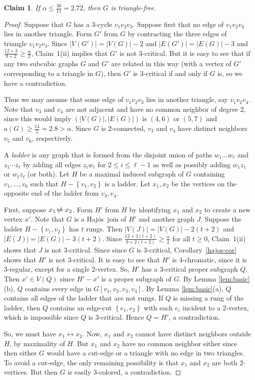 \documentclass[12pt]{article}
\theoremstyle{plain}
\newtheorem{clm}{Claim}
\theoremstyle{definition}
\theoremstyle{remark}
\newcommand{\set}[1]{\left\{ #1 \right\}}
\def\hajos{Haj\'{o}s}
\def\adj{\leftrightarrow}
\def\nonadj{\not\!\leftrightarrow}
\begin{document}
\begin{clm}
If $\alpha\le \frac{30}{11}=2.\overline{72}$, then $G$ is triangle-free.
\label{clm1}
\end{clm}
\begin{proof}
Suppose that $G$ has a 3-cycle $v_1v_2v_3$.  Suppose first that no edge of
$v_1v_2v_3$ lies in another triangle.  Form $G'$ from $G$ by contracting the
three edges of triangle $v_1v_2v_3$.  Since $|V(G')|=|V(G)|-2$ and
$|E(G')|=|E(G)|-3$ and $\frac{12+3}{9+2}\ge \frac{\alpha}{2}$, Claim~1(ii)
implies that $G'$ is not 3-critical.  But it is easy to see that if any two
subcubic graphs $G$ and $G'$ are related in this way (with a vertex of $G'$
corresponding to a triangle in $G$), then $G'$ is 3-critical if and only if $G$
is, so we have a contradiction.

Thus we may assume that some edge of $v_1v_2v_3$ lies in another triangle, say
$v_1v_2v_4$.  Note that $v_3$ and $v_4$ are not adjacent and have no common
neighbor of degree 2, since this would imply $(|V(G)|,|E(G)|)$ is $(4,6)$ or
$(5,7)$ and $a(G)\ge \frac{14}5=2.8>\alpha$.  Since $G$ is 2-connected, $v_3$
and $v_4$ have distinct neighbors $v_5$ and $v_6$, respectively.  

A \emph{ladder} is any graph that is formed from the disjoint union of paths $w_1\dots w_\ell$ and $z_1\cdots z_\ell$ by adding all edges $z_iw_i$ for $2 \le i \le \ell-1$ as well as possibly adding $w_1z_1$ or $w_\ell z_\ell$ (or both). 
Let $H$ be a maximal induced subgraph of $G$ containing $v_1, \ldots, v_6$ such that $H - \set{v_1, v_2}$ is a ladder.  Let $x_1, x_2$ be the vertices on the opposite end of the ladder from $v_3, v_4$.

First, suppose $x_1 \nonadj x_2$.  Form $H'$ from $H$ by identifying $x_1$ and $x_2$ to create a new vertex $x'$.  Note that $G$ is a
\hajos\ join of $H'$ and another graph $J$.  Suppose the ladder $H - \set{v_1, v_2}$ has $t$ rungs.  Then $|V(J)| = |V(G)| - 2(t+2)$ and $|E(J)| = |E(G)| - 3(t+2)$.  Since $\frac{12 + 3(t+2)}{9 + 2(t+2)} \ge \frac{\alpha}{2}$ for all $t \ge 0$, Claim~1(ii) 
shows that $J$ is not 3-critical.  Since since $G$ is 3-critical, Corollary~\ref{hajos-cor} shows that $H'$ is not 3-critical.  It is easy to see that $H'$ is 4-chromatic, since it is 3-regular, except for a single 2-vertex.  
So, $H'$ has a $3$-critical proper subgraph $Q$.  Then $x' \in V(Q)$ since $H'-x'$ is a proper subgraph of $G$.  
By Lemma \ref{lem:basic}(b), $Q$ contains every edge in $G[v_1,v_2,v_3,v_4]$.  
By Lemma \ref{lem:basic}(a), $Q$ contains all edges of the ladder that are not rungs.  
If $Q$ is missing a rung of the ladder, then $Q$ contains an edge-cut $\set{e_1, e_2}$ with each $e_i$ incident to a
2-vertex, which is impossible since $Q$ is $3$-critical.  Hence $Q = H'$, a contradiction.

So, we must have $x_1 \adj x_2$.  Now, $x_1$ and $x_2$ cannot have distinct neighbors outside $H$, by maximality of $H$.  
But $x_1$ and $x_2$ have no common neighbor either since then either $G$ would have a cut-edge or a triangle with no edge in two triangles.  To avoid a cut-edge, the only remaining possibility is that $x_1$ and $x_2$
are both 2-vertices.  But then $G$ is easily $3$-colored, a contradiction.
\end{proof}
\end{document}
